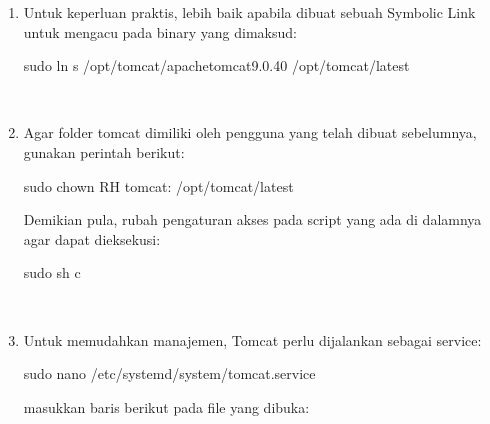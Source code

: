 \documentclass[letterpaper,10pt,english]{sphinxmanual}
\begin{document}
\begin{enumerate}
 

\item {} 
Untuk keperluan praktis, lebih baik apabila dibuat sebuah Symbolic Link untuk mengacu pada binary yang dimaksud:

\begin{sphinxVerbatim}[commandchars=\\\{\}]
sudo ln \PYGZhy{}s /opt/tomcat/apache\PYGZhy{}tomcat\PYGZhy{}9.0.40 /opt/tomcat/latest
\end{sphinxVerbatim}

 

\item {} 
Agar folder tomcat dimiliki oleh pengguna  yang telah dibuat sebelumnya, gunakan perintah berikut:

\begin{sphinxVerbatim}[commandchars=\\\{\}]
sudo chown \PYGZhy{}RH tomcat: /opt/tomcat/latest
\end{sphinxVerbatim}

Demikian pula, rubah pengaturan akses pada script yang ada di dalamnya agar dapat dieksekusi:

\begin{sphinxVerbatim}[commandchars=\\\{\}]
sudo sh \PYGZhy{}c 
\end{sphinxVerbatim}

 

\item {} 
Untuk memudahkan manajemen, Tomcat perlu dijalankan sebagai service:

\begin{sphinxVerbatim}[commandchars=\\\{\}]
sudo nano /etc/systemd/system/tomcat.service
\end{sphinxVerbatim}

masukkan baris berikut pada file yang dibuka:

\begin{sphinxVerbatim}[commandchars=\\\{\}]
\PYG{p}{[}\PYG{p}{]}
   

\PYG{p}{[}\PYG{p}{]}



\end{sphinxVerbatim}
\end{enumerate}
\end{document}
